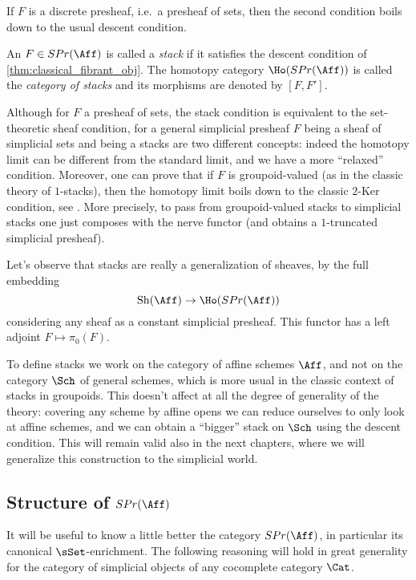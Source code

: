         If $F$ is a discrete presheaf, i.e.\ a presheaf of sets, then the second condition boils down to the usual descent condition.
        \begin{defn}
            \label{defn:stack_classic}
            An $F \in SPr(\Aff)$ is called a \emph{stack} if it satisfies the descent condition of \cref{thm:classical_fibrant_obj}. The homotopy category $\Ho(SPr(\Aff))$ is called the \emph{category of stacks} and its morphisms are denoted by $[F, F']$.
        \end{defn}
        \begin{remark}
            \label{remark:stack_sheaf_classic}
            Although for $F$ a presheaf of sets, the stack condition is equivalent to the set-theoretic sheaf condition, for a general simplicial presheaf $F$ being a sheaf of simplicial sets and being a stacks are two different concepts: indeed the homotopy limit can be different from the standard limit, and we have a more ``relaxed'' condition.
            Moreover, one can prove that if $F$ is groupoid-valued (as in the classic theory of $1$-stacks), then the homotopy limit boils down to the classic $2$-Ker condition, see \cite{Hennion:memoire}. More precisely, to pass from groupoid-valued stacks to simplicial stacks one just composes with the nerve functor (and obtains a $1$-truncated simplicial presheaf).
        \end{remark}
        Let's observe that stacks are really a generalization of sheaves, by the full embedding \[\mathrm{Sh}(\Aff) \to \Ho(SPr(\Aff)) \] considering any sheaf as a constant simplicial presheaf. This functor has a left adjoint $F \mapsto \pi_0(F)$.
        \begin{remark}
            \label{remark:why_work_on_aff}
            To define stacks we work on the category of affine schemes $\Aff$, and not on the category $\Sch$ of general schemes, which is more usual in the classic context of stacks in groupoids. This doesn't affect at all the degree of generality of the theory: covering any scheme by affine opens we can reduce ourselves to only look at affine schemes, and we can obtain a ``bigger'' stack on $\Sch$ using the descent condition. This will remain valid also in the next chapters, where we will generalize this construction to the simplicial world.
        \end{remark}

        \subsection{\texorpdfstring{Structure of $SPr(\Aff)$}{Structure of the category of simplicial presheaves}}
            It will be useful to know a little better the category $SPr(\Aff)$, in particular its canonical $\sSet$-enrichment. The following reasoning will hold in great generality for the category of simplicial objects of any cocomplete category $\Cat$.

